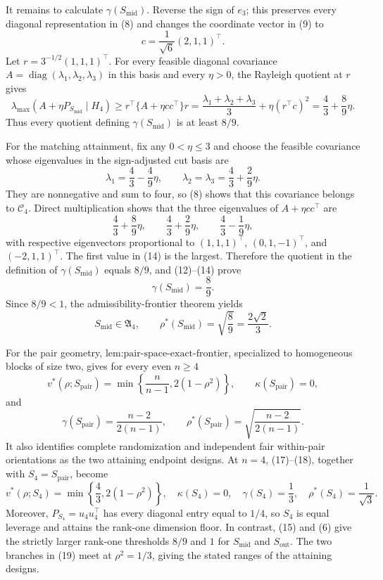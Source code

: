 It remains to calculate \(\gamma(S_{\mathrm{mid}})\). Reverse the sign of \(e_3\); this preserves every diagonal representation in (8) and changes the coordinate vector in (9) to
\[
c=\frac1{\sqrt6}(2,1,1)^\top.
\tag{11}
\]
Let \(r=3^{-1/2}(1,1,1)^\top\). For every feasible diagonal covariance \(A=\operatorname{diag}(\lambda_1,\lambda_2,\lambda_3)\) in this basis and every \(\eta>0\), the Rayleigh quotient at \(r\) gives
\[
\lambda_{\max}(A+\eta P_{S_{\mathrm{mid}}}\mid H_4)
\geq r^\top\{A+\eta cc^\top\}r
=\frac{\lambda_1+\lambda_2+\lambda_3}{3}
+\eta(r^\top c)^2
=\frac43+\frac89\eta.
\tag{12}
\]
Thus every quotient defining \(\gamma(S_{\mathrm{mid}})\) is at least \(8/9\).

For the matching attainment, fix any \(0<\eta\leq3\) and choose the feasible covariance whose eigenvalues in the sign-adjusted cut basis are
\[
\lambda_1=\frac43-\frac49\eta,
\qquad
\lambda_2=\lambda_3=\frac43+\frac29\eta.
\tag{13}
\]
They are nonnegative and sum to four, so (8) shows that this covariance belongs to \(\mathcal C_4\). Direct multiplication shows that the three eigenvalues of \(A+\eta cc^\top\) are
\[
\frac43+\frac89\eta,
\qquad
\frac43+\frac29\eta,
\qquad
\frac43-\frac19\eta,
\tag{14}
\]
with respective eigenvectors proportional to \((1,1,1)^\top\), \((0,1,-1)^\top\), and \((-2,1,1)^\top\). The first value in (14) is the largest. Therefore the quotient in the definition of \(\gamma(S_{\mathrm{mid}})\) equals \(8/9\), and (12)--(14) prove
\[
\gamma(S_{\mathrm{mid}})=\frac89.
\tag{15}
\]
Since \(8/9<1\), the admissibility-frontier theorem yields
\[
S_{\mathrm{mid}}\in\mathfrak A_4,
\qquad
\rho^*(S_{\mathrm{mid}})=\sqrt{\frac89}=\frac{2\sqrt2}{3}.
\tag{16}
\]

For the pair geometry, \(\text{lem:pair-space-exact-frontier}\), specialized to homogeneous blocks of size two, gives for every even \(n\geq4\)
\[
v^*(\rho;S_{\mathrm{pair}})
=\min\left\{\frac{n}{n-1},2(1-\rho^2)\right\},
\qquad
\kappa(S_{\mathrm{pair}})=0,
\tag{17}
\]
and
\[
\gamma(S_{\mathrm{pair}})=\frac{n-2}{2(n-1)},
\qquad
\rho^*(S_{\mathrm{pair}})=\sqrt{\frac{n-2}{2(n-1)}}.
\tag{18}
\]
It also identifies complete randomization and independent fair within-pair orientations as the two attaining endpoint designs. At \(n=4\), (17)--(18), together with \(S_4=S_{\mathrm{pair}}\), become
\[
v^*(\rho;S_4)=\min\left\{\frac43,2(1-\rho^2)\right\},
\quad
\kappa(S_4)=0,
\quad
\gamma(S_4)=\frac13,
\quad
\rho^*(S_4)=\frac1{\sqrt3}.
\tag{19}
\]
Moreover, \(P_{S_4}=u_4u_4^\top\) has every diagonal entry equal to \(1/4\), so \(S_4\) is equal leverage and attains the rank-one dimension floor. In contrast, (15) and (6) give the strictly larger rank-one thresholds \(8/9\) and \(1\) for \(S_{\mathrm{mid}}\) and \(S_{\mathrm{out}}\). The two branches in (19) meet at \(\rho^2=1/3\), giving the stated ranges of the attaining designs.

